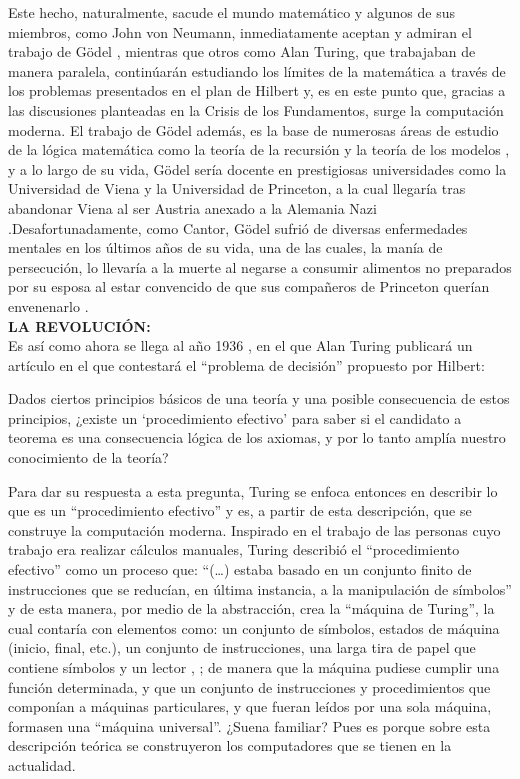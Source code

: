 \documentclass[a4paper,11pt]{article}
\begin{document}
Este hecho, naturalmente, sacude el mundo matemático y algunos de sus miembros, como John von Neumann, inmediatamente aceptan y admiran el trabajo de Gödel \cite{chaitin2003ordenadores}, mientras que otros como Alan Turing, que trabajaban de manera paralela, continúarán estudiando los límites de la matemática a través de los problemas presentados en el plan de Hilbert y, es en este punto que, gracias a las discusiones planteadas en la Crisis de los Fundamentos, surge la computación moderna. 
El trabajo de Gödel además, es la base de numerosas áreas de estudio de la lógica matemática como la teoría de la recursión y la teoría de los modelos \cite{chaitin2003ordenadores}, y a lo largo de su vida, Gödel sería docente en prestigiosas universidades como la Universidad de Viena y la Universidad de Princeton, a la cual llegaría tras abandonar Viena al ser Austria  anexado a la Alemania Nazi \cite{rago_2016}.Desafortunadamente, como Cantor, Gödel sufrió de diversas enfermedades mentales en los últimos años de su vida, una de las cuales, la manía de persecución, lo llevaría a la muerte al negarse a consumir alimentos no preparados por su esposa al estar convencido de que sus compañeros de Princeton querían envenenarlo \cite{baro_pizarro_2019}.\\  
{\large\bfseries LA REVOLUCIÓN:}\\
Es así como ahora se llega al año 1936 \cite{chaitin2003ordenadores}, en el que Alan Turing publicará un artículo en el que contestará el “problema de decisión” propuesto por Hilbert:
\begin{displayquote}
 Dados ciertos principios básicos de una teoría y una posible consecuencia de estos principios, ¿existe un ‘procedimiento efectivo’ para saber si el candidato a teorema es una consecuencia lógica de los axiomas, y por lo tanto amplía nuestro conocimiento de la teoría? \cite[p.5]{hernández_2013}
\end{displayquote}
Para dar su respuesta a esta pregunta, Turing se enfoca entonces en describir lo que es un “procedimiento efectivo” y es, a partir de esta descripción, que se construye la computación moderna. 
Inspirado en el trabajo de las personas cuyo trabajo era realizar cálculos manuales, Turing describió el “procedimiento efectivo” como un proceso que: “(…) estaba basado en un conjunto finito de instrucciones que se reducían, en última instancia, a la manipulación de símbolos” \cite[p.6]{hernández_2013} y de esta manera, por medio de la abstracción, crea la “máquina de Turing”, la cual contaría con elementos como: un conjunto de símbolos, estados de máquina (inicio, final, etc.), un conjunto de instrucciones, una larga tira de papel que contiene símbolos y un lector \cite{hernández_2013}, \cite{chaitin2003ordenadores}; de manera que la máquina pudiese cumplir una función determinada, y que un conjunto de instrucciones y procedimientos que componían a máquinas particulares, y que fueran leídos por una sola máquina, formasen una “máquina universal”\cite{hernández_2013}. ¿Suena familiar? Pues es porque sobre esta descripción teórica se construyeron los computadores que se tienen en la actualidad.
\end{document}
